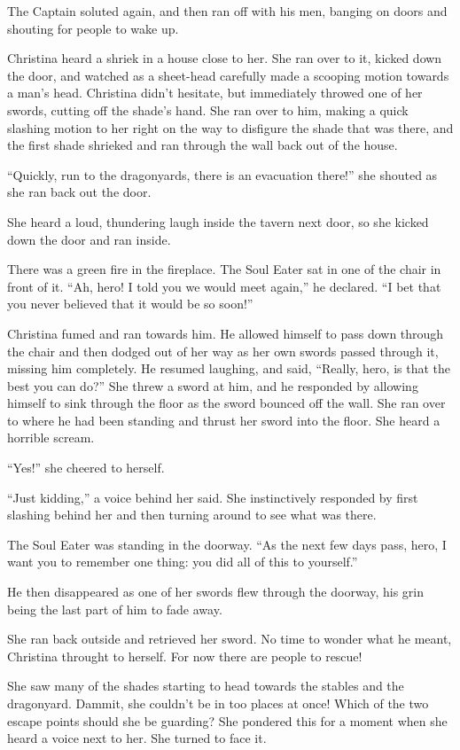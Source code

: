 \documentclass[showtrims,b6paper,draft,10pt]{memoir}
\begin{document}
The Captain soluted again, and then ran off with his men, banging on doors and shouting for people to wake up.

Christina heard a shriek in a house close to her.  She ran over to it, kicked down the door, and watched as a sheet-head carefully made a scooping motion towards a man's head.  Christina didn't hesitate, but immediately throwed one of her swords, cutting off the shade's hand.  She ran over to him, making a quick slashing motion to her right on the way to disfigure the shade that was there, and the first shade shrieked and ran through the wall back out of the house.

``Quickly, run to the dragonyards, there is an evacuation there!'' she shouted as she ran back out the door.  

She heard a loud, thundering laugh inside the tavern next door, so she kicked down the door and ran inside.

There was a green fire in the fireplace.  The Soul Eater sat in one of the chair in front of it.  ``Ah, hero!  I told you we would meet again,'' he declared.  ``I bet that you never believed that it would be so soon!''

Christina fumed and ran towards him.  He allowed himself to pass down through the chair and then dodged out of her way as her own swords passed through it, missing him completely.  He resumed laughing, and said,  ``Really, hero, is that the best you can do?''  She threw a sword at him, and he responded by allowing himself to sink through the floor as the sword bounced off the wall.  She ran over to where he had been standing and thrust her sword into the floor.  She heard a horrible scream.

``Yes!'' she cheered to herself.

``Just kidding,'' a voice behind her said.  She instinctively responded by first slashing behind her and then turning around to see what was there.

The Soul Eater was standing in the doorway.  ``As the next few days pass, hero, I want you to remember one thing:  you did all of this to yourself.''

He then disappeared as one of her swords flew through the doorway, his grin being the last part of him to fade away.

She ran back outside and retrieved her sword.  No time to wonder what he meant, Christina throught to herself.  For now there are people to rescue!

She saw many of the shades starting to head towards the stables and the dragonyard.  Dammit, she couldn't be in too places at once!  Which of the two escape points should she be guarding?  She pondered this for a moment when she heard a voice next to her.  She turned to face it.
\end{document}
